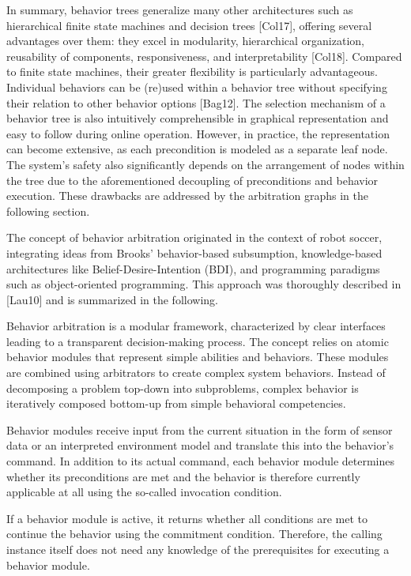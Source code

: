 In summary, behavior trees generalize many other architectures such as hierarchical finite state machines and decision trees [Col17], offering several advantages over them: they excel in modularity, hierarchical organization, reusability of components, responsiveness, and interpretability [Col18].
Compared to finite state machines, their greater flexibility is particularly advantageous.
Individual behaviors can be (re)used within a behavior tree without specifying their relation to other behavior options [Bag12].
The selection mechanism of a behavior tree is also intuitively comprehensible in graphical representation and easy to follow during online operation.
However, in practice, the representation can become extensive, as each precondition is modeled as a separate leaf node.
The system's safety also significantly depends on the arrangement of nodes within the tree due to the aforementioned decoupling of preconditions and behavior execution.
These drawbacks are addressed by the arbitration graphs in the following section.

The concept of behavior arbitration originated in the context of robot soccer, integrating ideas from Brooks' behavior-based subsumption, knowledge-based architectures like Belief-Desire-Intention (BDI), and programming paradigms such as object-oriented programming.
This approach was thoroughly described in [Lau10] and is summarized in the following.

Behavior arbitration is a modular framework, characterized by clear interfaces leading to a transparent decision-making process.
The concept relies on atomic behavior modules that represent simple abilities and behaviors.
These modules are combined using arbitrators to create complex system behaviors.
Instead of decomposing a problem top-down into subproblems, complex behavior is iteratively composed bottom-up from simple behavioral competencies.

Behavior modules receive input from the current situation in the form of sensor data or an interpreted environment model and translate this into the behavior's command.
In addition to its actual command, each behavior module determines whether its preconditions are met and the behavior is therefore currently applicable at all using the so-called invocation condition.

If a behavior module is active, it returns whether all conditions are met to continue the behavior using the commitment condition.
Therefore, the calling instance itself does not need any knowledge of the prerequisites for executing a behavior module.

